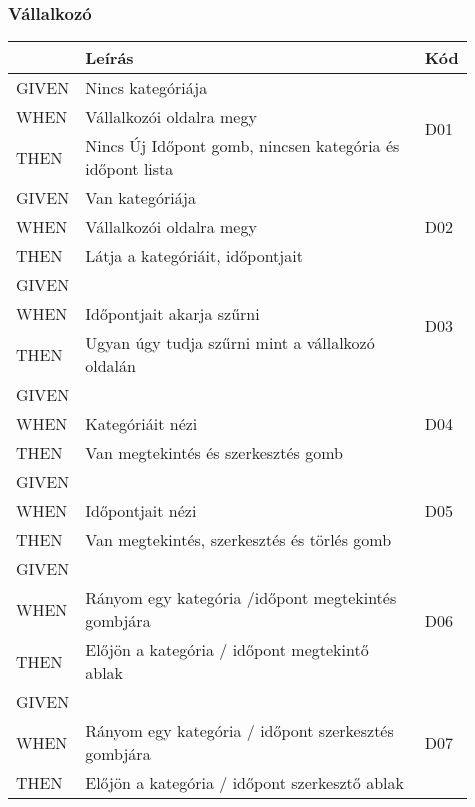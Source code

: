 \subsubsection{Vállalkozó}

\begin{table}[H]
	\centering
	\begin{tabular}{|m{0.1\linewidth}|m{0.75\linewidth}|m{0.06\linewidth}|}
		\hline
		& \textbf{Leírás} & \textbf{Kód} \\
		\hline
		GIVEN & Nincs kategóriája & \multirow{3}{*}{D01} \\ \cline{1-2}
		WHEN  & Vállalkozói oldalra megy & \\ \cline{1-2}
		THEN  & Nincs Új Időpont gomb, nincsen kategória és időpont lista & \\ 
		\hline
		GIVEN & Van kategóriája & \multirow{3}{*}{D02} \\ \cline{1-2}
		WHEN  & Vállalkozói oldalra megy & \\ \cline{1-2}
		THEN  & Látja a kategóriáit, időpontjait & \\ 
		\hline
		GIVEN &  & \multirow{3}{*}{D03} \\ \cline{1-2}
		WHEN  & Időpontjait akarja szűrni & \\ \cline{1-2}
		THEN  & Ugyan úgy tudja szűrni mint a vállalkozó oldalán & \\ 
		\hline
		GIVEN &  & \multirow{3}{*}{D04} \\ \cline{1-2}
		WHEN  & Kategóriáit nézi & \\ \cline{1-2}
		THEN  & Van megtekintés és szerkesztés gomb & \\ 
		\hline
		GIVEN &  & \multirow{3}{*}{D05} \\ \cline{1-2}
		WHEN  & Időpontjait nézi & \\ \cline{1-2}
		THEN  & Van megtekintés, szerkesztés és törlés gomb & \\ 
		\hline
		GIVEN &  & \multirow{3}{*}{D06} \\ \cline{1-2}
		WHEN  & Rányom egy kategória /időpont megtekintés gombjára & \\ \cline{1-2}
		THEN  & Előjön a kategória / időpont megtekintő ablak & \\ 
		\hline
		GIVEN &  & \multirow{3}{*}{D07} \\ \cline{1-2}
		WHEN  & Rányom egy kategória / időpont szerkesztés gombjára & \\ \cline{1-2}
		THEN  & Előjön a kategória / időpont szerkesztő ablak & \\ 

\end{tabular}
\end{table}
